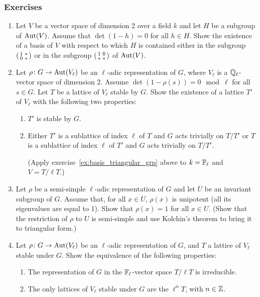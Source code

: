 \subsubsection*{Exercises}
\begin{enumerate}
	\item\label{ex:basis_triangular_grp}
		Let $V$ be a vector space of dimension 2 over a field $k$ and
		let $H$ be a subgroup of $\operatorname{Aut}(V)$. Assume that $\det(1-h) = 0$
		for all $h \in H$. Show the existence of a basis of $V$ with
		respect to which $H$ is contained either in the subgroup $
		\begin{psmallmatrix}
			1 & * \\
			0 & *
		\end{psmallmatrix}
		$ or in the subgroup $
		\begin{psmallmatrix}
			1 & 0 \\
			* & *
		\end{psmallmatrix}
		$ of $\operatorname{Aut}(V)$.
	\item\label{ex:I11_ex2}
		Let $\rho \colon G \to \operatorname{Aut}(V_\ell)$ be an $\ell$-adic
		representation of $G$, where $V_\ell$ is a $\mathbb{Q}_\ell$-vector
		space of dimension 2. Assume $\det(1-\rho(s))= 0 \mod\ell$ for
		all $s \in G$. Let $T$ be a lattice of $V_\ell$ stable by $G$.
		Show the existence of a lattice $T'$ of $V_\ell$ with the
		following two properties:
	\begin{enumerate}
		\item $T'$ is stable by $G$.
		\item Either $T'$ is a sublattice of index $\ell$ of $T$ and
			\dpage
			$G$ acts trivially on $T/T'$ or $T$ is a sublattice of
			index $\ell$ of $T'$ and $G$ acts trivially on $T/T'$.
			\label{errata:t't}

			(Apply exercise~\ref{ex:basis_triangular_grp} above to
			$k = \mathbb{F}_\ell$ and $V = T/\ell T$.)
	\end{enumerate}

	\item Let $\rho$ be a semi-simple $\ell$-adic representation of $G$ and
		let $U$ be an invariant subgroup of $G$.  Assume that, for all
		$x \in U$, $\rho(x)$ is unipotent (all its eigenvalues are
		equal to 1). Show that $\rho(x) = 1$ for all $x \in U$. (Show
		that the restriction of $\rho$ to $U$ is semi-simple and use
		Kolchin's theorem to bring it to triangular form.)
	\item Let $\rho \colon G \to \operatorname{Aut}(V_\ell)$ be an $\ell$-adic
		representation of $G$, and $T$ a lattice of $V_\ell$ stable
		under $G$. Show the equivalence of the following properties:
	\begin{enumerate}
		\item The representation of $G$ in the $\mathbb{F}_\ell$-vector space
			$T/\ell T$ is irreducible.
		\item The only lattices of $V_\ell$ stable under $G$ are the
			$\ell^n T$, with $n \in \mathbb{Z}$.
	\end{enumerate}
\end{enumerate}

